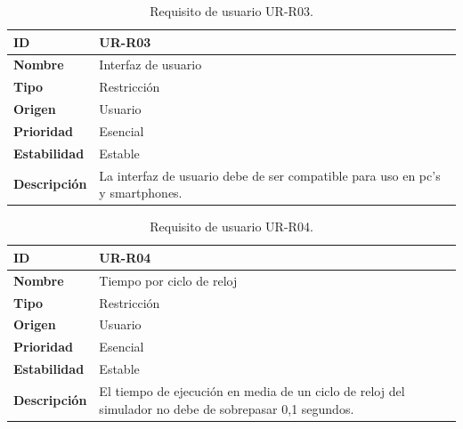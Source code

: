 \begin{center}
\begin{table}[htbp]
\centering
\begin{tabular}{@{}p{2.5cm} p{9cm}@{}} 
\toprule
\textbf{ID} 				& UR-R03 \\
\midrule
\textbf{Nombre} 			& Interfaz de usuario \\
\midrule
\textbf{Tipo} 			& Restricción \\
\midrule
\textbf{Origen} 			& Usuario \\
\midrule
\textbf{Prioridad}		& Esencial \\
\midrule
\textbf{Estabilidad} 		& Estable \\
\midrule
\textbf{Descripción} 	& La interfaz de usuario debe de ser compatible para uso en pc's y smartphones. \\
\bottomrule
\end{tabular}
\caption{Requisito de usuario UR-R03.}
\label{tab:urr03}
\end{table}
\end{center}

\begin{center}
\begin{table}[htbp]
\centering
\begin{tabular}{@{}p{2.5cm} p{9cm}@{}} 
\toprule
\textbf{ID} 				& UR-R04 \\
\midrule
\textbf{Nombre} 			& Tiempo por ciclo de reloj \\
\midrule
\textbf{Tipo} 			& Restricción \\
\midrule
\textbf{Origen} 			& Usuario \\
\midrule
\textbf{Prioridad}		& Esencial \\
\midrule
\textbf{Estabilidad} 		& Estable \\
\midrule
\textbf{Descripción} 	& El tiempo de ejecución en media de un ciclo de reloj del simulador no debe de sobrepasar 0,1 segundos. \\
\bottomrule
\end{tabular}
\caption{Requisito de usuario UR-R04.}
\label{tab:urr04}
\end{table}
\end{center}

